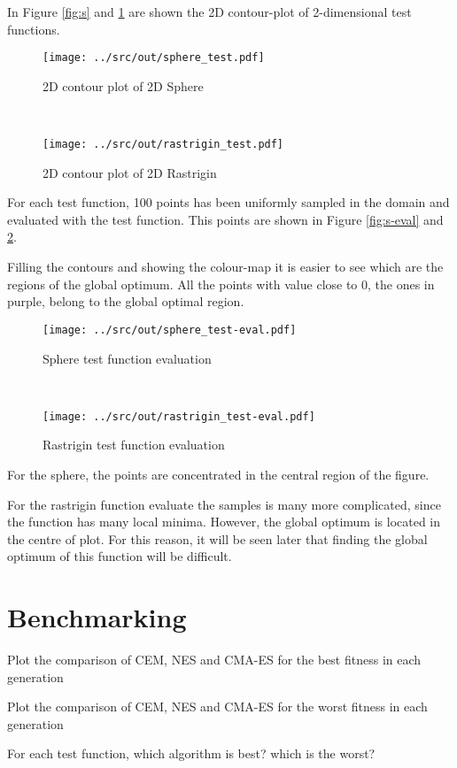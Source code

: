 \documentclass[a4paper,12pt]{article} %
\begin{document}
In Figure \ref{fig:s} and \ref{fig:r} are shown the 2D contour-plot of 2-dimensional test functions.

\begin{figure}[htb]
	\begin{minipage}[b]{.49\textwidth}
		\centering
		\texttt{[image: ../src/out/sphere\_test.pdf]}	
		\caption{2D contour plot of 2D Sphere}
		\label{fig:s}
	\end{minipage}
	~
	\begin{minipage}[b]{.49\textwidth}
		\centering
		\texttt{[image: ../src/out/rastrigin\_test.pdf]}	
		\caption{2D contour plot of 2D Rastrigin}
		\label{fig:r}
	\end{minipage}
\end{figure}
For each test function, 100 points has been uniformly sampled in the domain and evaluated with the test function. This points are shown in Figure \ref{fig:s-eval} and \ref{fig:r-eval}. 

Filling the contours and showing the colour-map it is easier to see which are the regions of the global optimum. All the points with value close to 0, the ones in purple, belong to the global optimal region.

\begin{figure}[htb]
	\begin{minipage}[b]{.49\textwidth}
		\centering
		\texttt{[image: ../src/out/sphere\_test-eval.pdf]}	
		\caption{Sphere test function evaluation}
		\label{fig:s-eval}
	\end{minipage}
	~
	\begin{minipage}[b]{.49\textwidth}
		\centering
		\texttt{[image: ../src/out/rastrigin\_test-eval.pdf]}	
		\caption{Rastrigin test function evaluation}
		\label{fig:r-eval}
	\end{minipage}
\end{figure}

For the sphere, the points are concentrated in the central region of the figure. 

For the rastrigin function evaluate the samples is many more complicated, since the function has many local minima. However, the global optimum is located in the centre of plot. For this reason, it will be seen later that finding the global optimum of this function will be difficult.
 




	
			
\section{Benchmarking}
Plot the comparison of CEM, NES and CMA-ES for the best fitness in each generation

Plot the comparison of CEM, NES and CMA-ES for the worst fitness in each generation

For each test function, which algorithm is best? which is the worst?
\end{document}
